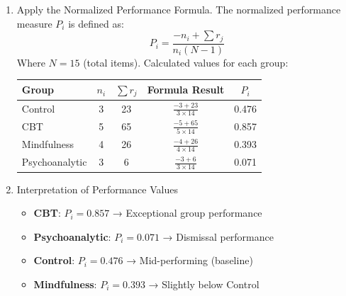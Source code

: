\documentclass[a4paper,fleqn,review]{cas-sc}
\begin{document}
\begin{enumerate}[Step 1.]
	\item Apply the Normalized Performance Formula. The normalized performance measure $P_i$ is defined as:
	\[
	P_i = \frac{-n_i + \sum r_j}{n_i (N - 1)}
	\]
	Where $N = 15$ (total items).
	Calculated values for each group:
	\begin{center}
		\renewcommand{\arraystretch}{1.3}
		\begin{tabular}{|l|c|c|c|c|}
			\hline
			\textbf{Group} & $n_i$ & $\sum r_j$ & Formula Result & $P_i$ \\
			\hline
			Control & 3 & 23 & $\frac{-3 + 23}{3 \times 14}$ & 0.476 \\
			CBT & 5 & 65 & $\frac{-5 + 65}{5 \times 14}$ & 0.857 \\
			Mindfulness & 4 & 26 & $\frac{-4 + 26}{4 \times 14}$ & 0.393 \\
			Psychoanalytic & 3 & 6 & $\frac{-3 + 6}{3 \times 14}$ & 0.071 \\
			\hline
		\end{tabular}
	\end{center}
	
	\item Interpretation of Performance Values
	\begin{itemize}
		\item \textbf{CBT}: $P_i = 0.857$ → Exceptional group performance
		\item \textbf{Psychoanalytic}: $P_i = 0.071$ → Dismissal performance
		\item \textbf{Control}: $P_i = 0.476$ → Mid-performing (baseline)
		\item \textbf{Mindfulness}: $P_i = 0.393$ → Slightly below Control
	\end{itemize}

\end{enumerate}

\pagebreak


\appendix
\end{document}
